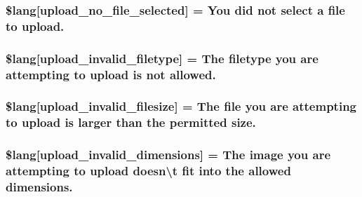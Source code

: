 \subsubsection[{\$lang}]{\setlength{\rightskip}{0pt plus 5cm}\$lang\mbox{[}\textquotesingle{}upload\+\_\+no\+\_\+file\+\_\+selected\textquotesingle{}\mbox{]} = \textquotesingle{}You did not select {\bf a} file to upload.\textquotesingle{}}\label{system_2language_2english_2upload__lang_8php_a88d8e8f9b879d1c25e6c089f3d3b5a30}
\hypertarget{system_2language_2english_2upload__lang_8php_ac8631aa85ed80396bd78e91a76d5fd38}{}
\subsubsection[{\$lang}]{\setlength{\rightskip}{0pt plus 5cm}\$lang\mbox{[}\textquotesingle{}upload\+\_\+invalid\+\_\+filetype\textquotesingle{}\mbox{]} = \textquotesingle{}The filetype you are attempting to upload is not allowed.\textquotesingle{}}\label{system_2language_2english_2upload__lang_8php_ac8631aa85ed80396bd78e91a76d5fd38}
\hypertarget{system_2language_2english_2upload__lang_8php_a832b3ec1d84b1d48a488cf525954d8f2}{}
\subsubsection[{\$lang}]{\setlength{\rightskip}{0pt plus 5cm}\$lang\mbox{[}\textquotesingle{}upload\+\_\+invalid\+\_\+filesize\textquotesingle{}\mbox{]} = \textquotesingle{}The file you are attempting to upload is larger than the permitted size.\textquotesingle{}}\label{system_2language_2english_2upload__lang_8php_a832b3ec1d84b1d48a488cf525954d8f2}
\hypertarget{system_2language_2english_2upload__lang_8php_a4e796eeccf7df90acffea7884a5bd558}{}
\subsubsection[{\$lang}]{\setlength{\rightskip}{0pt plus 5cm}\$lang\mbox{[}\textquotesingle{}upload\+\_\+invalid\+\_\+dimensions\textquotesingle{}\mbox{]} = \textquotesingle{}The image you are attempting to upload doesn\textbackslash{}\textquotesingle{}t fit into the allowed dimensions.\textquotesingle{}}\label{system_2language_2english_2upload__lang_8php_a4e796eeccf7df90acffea7884a5bd558}
\hypertarget{system_2language_2english_2upload__lang_8php_a31be70c748b9bfc43dd7468e1fa64c42}{}
